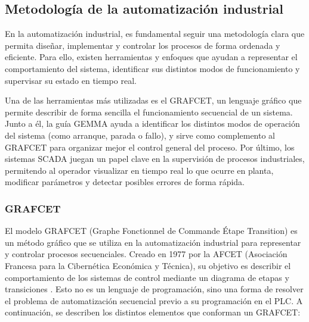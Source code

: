 \subsection{Metodología de la automatización industrial}

En la automatización industrial, es fundamental seguir una metodología clara que permita diseñar, implementar y controlar los procesos de forma ordenada y eficiente. Para ello, existen herramientas y enfoques que ayudan a representar el comportamiento del sistema, identificar sus distintos modos de funcionamiento y supervisar su estado en tiempo real.

Una de las herramientas más utilizadas es el GRAFCET, un lenguaje gráfico que permite describir de forma sencilla el funcionamiento secuencial de un sistema. Junto a él, la guía GEMMA ayuda a identificar los distintos modos de operación del sistema (como arranque, parada o fallo), y sirve como complemento al GRAFCET para organizar mejor el control general del proceso. Por último, los sistemas SCADA juegan un papel clave en la supervisión de procesos industriales, permitendo al operador visualizar en tiempo real lo que ocurre en planta, modificar parámetros y detectar posibles errores de forma rápida.

\newpage

\subsubsection{GRAFCET}

El modelo GRAFCET (Graphe Fonctionnel de Commande Étape Transition) es un método gráfico que se utiliza en la automatización industrial para representar y controlar procesos secuenciales. Creado en 1977 por la AFCET (Asociación Francesa para la Cibernética Económica y Técnica), su objetivo es describir el comportamiento de los sistemas de control mediante un diagrama de etapas y transiciones \cite{grafcet_info}. Esto no es un lenguaje de programación, sino una forma de resolver el problema de automatización secuencial previo a su programación en el PLC. A continuación, se describen los distintos elementos que conforman un GRAFCET:

